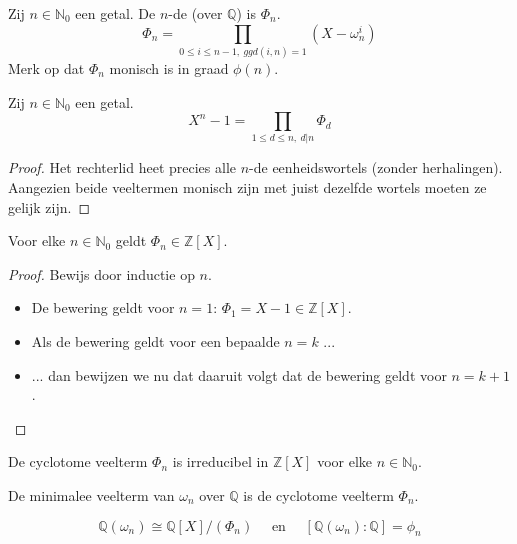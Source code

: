 \documentclass[main.tex]{subfiles}
\begin{document}
\begin{de}
  Zij $n\in \mathbb{N}_{0}$ een getal.
  De $n$-de  (over $\mathbb{Q}$) is $\Phi_{n}$.
  \[ \Phi_{n} = \prod_{0\le i \le n-1,\ ggd(i,n)= 1}(X-\omega_{n}^{i})\]
  Merk op dat $\Phi_{n}$ monisch is in graad $\phi(n)$.
\end{de}

\begin{ei}
  Zij $n\in \mathbb{N}_{0}$ een getal.
  \[ X^{n}-1 = \prod_{1\le d\le n,\ d|n}\Phi_{d} \]
  \begin{proof}
    Het rechterlid heet precies alle $n$-de eenheidswortels (zonder herhalingen).\waarom
    Aangezien beide veeltermen monisch zijn met juist dezelfde wortels moeten ze gelijk zijn.
  \end{proof}
\end{ei}

\begin{pr}
  Voor elke $n\in \mathbb{N}_{0}$ geldt $\Phi_{n} \in \mathbb{Z}[X]$.

  \begin{proof}
    Bewijs door inductie op $n$.
    \begin{itemize}
    \item De bewering geldt voor $n=1$: $\Phi_{1} = X-1 \in \mathbb{Z}[X]$. 
    \item Als de bewering geldt voor een bepaalde $n=k$ ...
    \item ... dan bewijzen we nu dat daaruit volgt dat de bewering geldt voor $n=k+1$.
      
    \end{itemize}
  \end{proof}
\end{pr}

\begin{st}
  De cyclotome veelterm $\Phi_{n}$ is irreducibel in $\mathbb{Z}[X]$ voor elke $n\in \mathbb{N}_{0}$.
  \zb
\end{st}

\begin{gev}
  De minimalee veelterm van $\omega_{n}$ over $\mathbb{Q}$ is de cyclotome veelterm $\Phi_{n}$.
\end{gev}

\begin{gev}
  \[ \mathbb{Q}(\omega_{n}) \cong \mathbb{Q}[X]/(\Phi_{n}) \quad\text{ en }\quad [\mathbb{Q}(\omega_{n}):\mathbb{Q}] = \phi_{n} \]
\end{gev}
\end{document}
